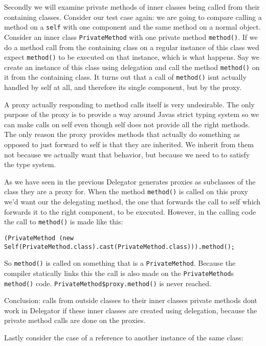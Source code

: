 \documentclass[a4paper,12pt]{book}
\begin{document}
Secondly we will examine private methods of inner classes being called from their containing classes. Consider our test case again: we are going to compare calling a method on a \verb|self| with one component and the same method on a normal object. Consider an inner class \verb|PrivateMethod| with one private method \verb|method()|. If we do a method call from the containing class on a regular instance of this class wed expect \verb|method()| to be executed on that instance, which is what happens. Say we create an instance of this class using delegation and call the method \verb|method()| on it from the containing class. It turns out that a call of \verb|method()| isnt actually handled by self at all, and therefore its single component, but by the proxy. 

A proxy actually responding to method calls itself is very undesirable. The only purpose of the proxy is to provide a way around Javas strict typing system so we can make calls on self even though self does not provide all the right methods. The only reason the proxy provides methods that actually do something as opposed to just forward to self is that they are inherited. We inherit from them not because we actually want that behavior, but because we need to to satisfy the type system. 

As we have seen in the previous Delegator generates proxies as subclasses of the class they are a proxy for. When the method \verb|method()| is called on this proxy we'd want our the delegating method, the one that forwards the call to self which forwards it to the right component, to be executed. However, in the calling code the call to \verb|method()| is made like this:

\begin{verbatim}
(PrivateMethod (new Self(PrivateMethod.class).cast(PrivateMethod.class))).method();
\end{verbatim}

So \verb|method()| is called on something that is a \verb|PrivateMethod|. Because the compiler statically links this the call is also made on the \verb|PrivateMethod|s \verb|method()| code. \verb|PrivateMethod$proxy.method()| is never reached.

Conclusion: calls from outside classes to their inner classes private methods dont work in Delegator if these inner classes are created using delegation, because the private method calls are done on the proxies.

Lastly consider the case of a reference to another instance of the same class:
\end{document}
